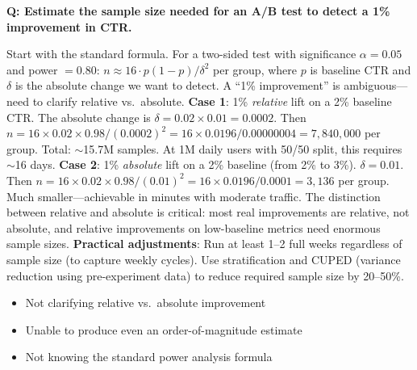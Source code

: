 \begin{interviewq}
\end{interviewq}

\begin{interviewq}
\textbf{Q: Estimate the sample size needed for an A/B test to detect a 1\% improvement in CTR.}

 \quad {} \quad \badgefreq{\freqmed}

\stronganswer Start with the standard formula. For a two-sided test with significance $\alpha = 0.05$ and power $= 0.80$: $n \approx 16 \cdot p(1-p) / \delta^2$ per group, where $p$ is baseline CTR and $\delta$ is the absolute change we want to detect. A ``1\% improvement'' is ambiguous---need to clarify relative vs.\ absolute. \textbf{Case 1}: 1\% \textit{relative} lift on a 2\% baseline CTR. The absolute change is $\delta = 0.02 \times 0.01 = 0.0002$. Then $n = 16 \times 0.02 \times 0.98 / (0.0002)^2 = 16 \times 0.0196 / 0.00000004 = 7{,}840{,}000$ per group. Total: $\sim$15.7M samples. At 1M daily users with 50/50 split, this requires $\sim$16 days. \textbf{Case 2}: 1\% \textit{absolute} lift on a 2\% baseline (from 2\% to 3\%). $\delta = 0.01$. Then $n = 16 \times 0.02 \times 0.98 / (0.01)^2 = 16 \times 0.0196 / 0.0001 = 3{,}136$ per group. Much smaller---achievable in minutes with moderate traffic. The distinction between relative and absolute is critical: most real improvements are relative, not absolute, and relative improvements on low-baseline metrics need enormous sample sizes. \textbf{Practical adjustments}: Run at least 1--2 full weeks regardless of sample size (to capture weekly cycles). Use stratification and CUPED (variance reduction using pre-experiment data) to reduce required sample size by 20--50\%.

\redflags
\begin{itemize}
    \item Not clarifying relative vs.\ absolute improvement
    \item Unable to produce even an order-of-magnitude estimate
    \item Not knowing the standard power analysis formula
\end{itemize}



\end{interviewq}
